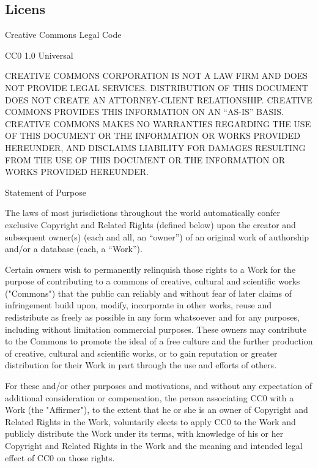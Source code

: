 \documentclass[a4paper,12pt]{article}
\begin{document}
\begin{appendices}

\section{Licens}
\label{ref:licens}
 Creative Commons Legal Code

CC0 1.0 Universal

    CREATIVE COMMONS CORPORATION IS NOT A LAW FIRM AND DOES NOT PROVIDE
    LEGAL SERVICES. DISTRIBUTION OF THIS DOCUMENT DOES NOT CREATE AN
    ATTORNEY-CLIENT RELATIONSHIP. CREATIVE COMMONS PROVIDES THIS
    INFORMATION ON AN ``AS-IS'' BASIS. CREATIVE COMMONS MAKES NO WARRANTIES
    REGARDING THE USE OF THIS DOCUMENT OR THE INFORMATION OR WORKS
    PROVIDED HEREUNDER, AND DISCLAIMS LIABILITY FOR DAMAGES RESULTING FROM
    THE USE OF THIS DOCUMENT OR THE INFORMATION OR WORKS PROVIDED
    HEREUNDER.

Statement of Purpose

The laws of most jurisdictions throughout the world automatically confer
exclusive Copyright and Related Rights (defined below) upon the creator
and subsequent owner(s) (each and all, an ``owner'') of an original work of
authorship and/or a database (each, a ``Work'').

Certain owners wish to permanently relinquish those rights to a Work for
the purpose of contributing to a commons of creative, cultural and
scientific works ("Commons") that the public can reliably and without fear
of later claims of infringement build upon, modify, incorporate in other
works, reuse and redistribute as freely as possible in any form whatsoever
and for any purposes, including without limitation commercial purposes.
These owners may contribute to the Commons to promote the ideal of a free
culture and the further production of creative, cultural and scientific
works, or to gain reputation or greater distribution for their Work in
part through the use and efforts of others.

For these and/or other purposes and motivations, and without any
expectation of additional consideration or compensation, the person
associating CC0 with a Work (the "Affirmer"), to the extent that he or she
is an owner of Copyright and Related Rights in the Work, voluntarily
elects to apply CC0 to the Work and publicly distribute the Work under its
terms, with knowledge of his or her Copyright and Related Rights in the
Work and the meaning and intended legal effect of CC0 on those rights.


\end{appendices}
\end{document}
